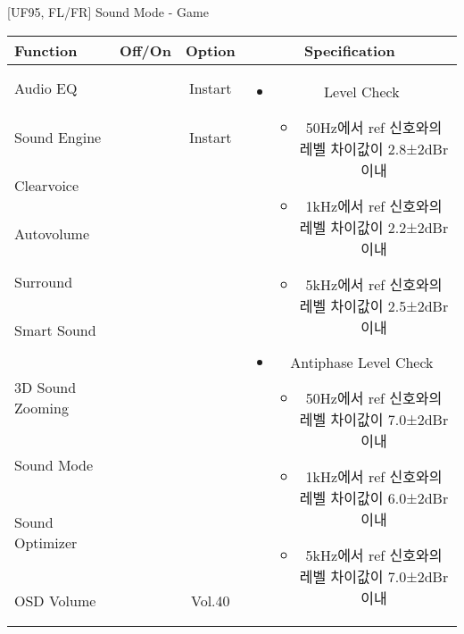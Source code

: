 \begin{frame}[t]{[UF95, FL/FR] Sound Mode - Game}
\begin{tiny}
\begin{tabular}{@{}lccc@{}}
\toprule
Function & Off/On & Option & Specification \\
\midrule
Audio EQ & \color{black}{Off} & Instart &
\multirow{10}{60mm}{
\begin{itemize}
\item Level Check
  \begin{itemize}
  \item 50Hz에서 ref 신호와의 레벨 차이값이 2.8±2dBr 이내
  \item 1kHz에서 ref 신호와의 레벨 차이값이 2.2±2dBr 이내
  \item 5kHz에서 ref 신호와의 레벨 차이값이 2.5±2dBr 이내
  \end{itemize}
\item Antiphase Level Check
  \begin{itemize}
  \item 50Hz에서 ref 신호와의 레벨 차이값이 7.0±2dBr 이내
  \item 1kHz에서 ref 신호와의 레벨 차이값이 6.0±2dBr 이내
  \item 5kHz에서 ref 신호와의 레벨 차이값이 7.0±2dBr 이내
  \end{itemize}
\end{itemize}
} \\
Sound Engine & \color{blue}{On} & Instart & \\
Clearvoice & \color{black}{Off} & & \\
Autovolume & \color{black}{Off} & & \\
Surround & \color{black}{Off} & & \\
Smart Sound & \color{black}{Off} & & \\
3D Sound Zooming & \color{black}{Off} & & \\
Sound Mode & \color{blue}{On} & \color{blue}{Game} & \\
Sound Optimizer & \color{black}{Off} & & \\
OSD Volume & \color{blue}{On} & Vol.40 & \\
\midrule
\end{tabular}
\end{tiny}

\end{frame}


